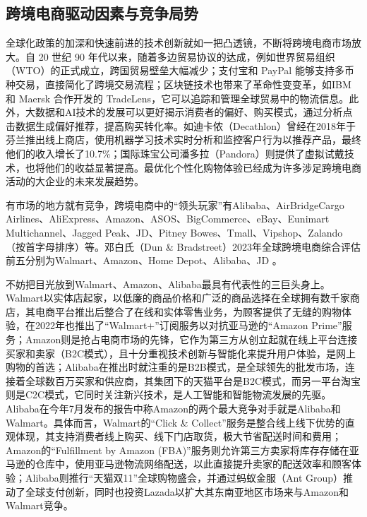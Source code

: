 \documentclass[12pt]{ctexart}
\begin{document}
\subsection{跨境电商驱动因素与竞争局势}
全球化政策的加深和快速前进的技术创新就如一把凸透镜，不断将跨境电商市场放大。自 20 世纪 90 年代以来，随着多边贸易协议的达成，例如世界贸易组织（WTO）的正式成立，跨国贸易壁垒大幅减少；支付宝和 PayPal 能够支持多币种交易，直接简化了跨境交易流程；区块链技术也带来了革命性变变革，如IBM 和 Maersk 合作开发的 TradeLens，它可以追踪和管理全球贸易中的物流信息\cite{8}。此外，大数据和AI技术的发展可以更好揭示消费者的偏好、购买模式，通过分析点击数据生成偏好推荐，提高购买转化率。如迪卡侬（Decathlon）曾经在2018年于芬兰推出线上商店，使用机器学习技术实时分析和监控客户行为以推荐产品，最终他们的收入增长了10.7\%；国际珠宝公司潘多拉（Pandora）则提供了虚拟试戴技术，也将他们的收益显著提高\cite{3}。最优化个性化购物体验已经成为许多涉足跨境电商活动的大企业的未来发展趋势\cite{7}。

有市场的地方就有竞争，跨境电商中的“领头玩家”有Alibaba、AirBridgeCargo Airlines、AliExpress、Amazon、ASOS、BigCommerce、eBay、Eunimart Multichannel、Jagged Peak、JD、Pitney Bowes、Tmall、Vipshop、Zalando（按首字母排序）等\cite{9}。邓白氏（Dun \& Bradstreet）2023年全球跨境电商综合评估前五分别为Walmart、Amazon、Home Depot、Alibaba、JD \cite{10}。

不妨把目光放到Walmart、Amazon、Alibaba最具有代表性的三巨头身上。Walmart以实体店起家，以低廉的商品价格和广泛的商品选择在全球拥有数千家商店，其电商平台推出后整合了在线和实体零售业务，为顾客提供了无缝的购物体验，在2022年也推出了“Walmart+”订阅服务以对抗亚马逊的“Amazon Prime”服务\cite{11}；Amazon则是抢占电商市场的先锋，它作为第三方从创立起就在线上平台连接买家和卖家（B2C模式），且十分重视技术创新与智能化来提升用户体验，是网上购物的首选\cite{12}；Alibaba在推出时就注重的是B2B模式，是全球领先的批发市场，连接着全球数百万买家和供应商，其集团下的天猫平台是B2C模式，而另一平台淘宝则是C2C模式，它同时关注新兴技术，是人工智能和智能物流发展的先驱。Alibaba在今年7月发布的报告\cite{11}中称Amazon的两个最大竞争对手就是Alibaba和Walmart。具体而言，Walmart的“Click \& Collect”服务是整合线上线下优势的直观体现，其支持消费者线上购买、线下门店取货，极大节省配送时间和费用；Amazon的“Fulfillment by Amazon (FBA)”服务则允许第三方卖家将库存存储在亚马逊的仓库中，使用亚马逊物流网络配送，以此直接提升卖家的配送效率和顾客体验；Alibaba则推行“天猫双11”全球购物盛会，并通过蚂蚁金服（Ant Group）推动了全球支付创新，同时也投资Lazada以扩大其东南亚地区市场来与Amazon和Walmart竞争。
\end{document}
